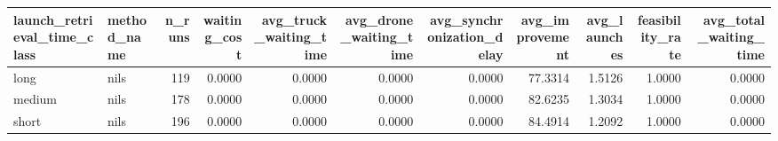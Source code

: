 \begin{tabular}{llrrrrrrrrr}
\toprule
launch_retrieval_time_class & method_name & n_runs & waiting_cost & avg_truck_waiting_time & avg_drone_waiting_time & avg_synchronization_delay & avg_improvement & avg_launches & feasibility_rate & avg_total_waiting_time \\
\midrule
long & nils & 119 & 0.0000 & 0.0000 & 0.0000 & 0.0000 & 77.3314 & 1.5126 & 1.0000 & 0.0000 \\
medium & nils & 178 & 0.0000 & 0.0000 & 0.0000 & 0.0000 & 82.6235 & 1.3034 & 1.0000 & 0.0000 \\
short & nils & 196 & 0.0000 & 0.0000 & 0.0000 & 0.0000 & 84.4914 & 1.2092 & 1.0000 & 0.0000 \\
\bottomrule
\end{tabular}
